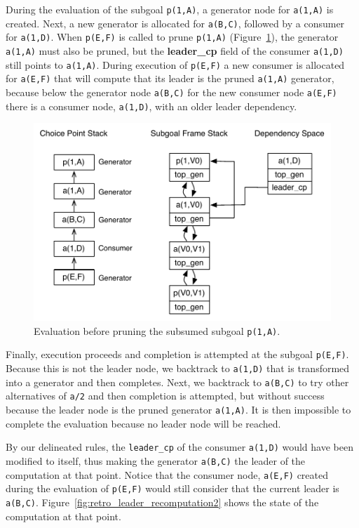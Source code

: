 During the evaluation of the subgoal \texttt{p(1,A)}, a generator node
for \texttt{a(1,A)} is created. Next, a new generator is allocated for \texttt{a(B,C)},
followed by a consumer for \texttt{a(1,D)}. When \texttt{p(E,F)} is called to
prune \texttt{p(1,A)} (Figure~\ref{fig:retro_leader_recomputation}), the generator \texttt{a(1,A)}
must also be pruned, but the \textbf{leader\_cp} field of the consumer \texttt{a(1,D)} still points
to \texttt{a(1,A)}. During execution of \texttt{p(E,F)} a new consumer is allocated for \texttt{a(E,F)} that
will compute that its leader is the pruned \texttt{a(1,A)} generator, because below
the generator node \texttt{a(B,C)} for the new consumer node \texttt{a(E,F)} there is a consumer node,
\texttt{a(1,D)}, with an older leader dependency.

\begin{figure}[ht]
  \centering
    \includegraphics[scale=0.6]{retro_leader_recomputation.pdf}
  \caption{Evaluation before pruning the subsumed subgoal \texttt{p(1,A)}.}
  \label{fig:retro_leader_recomputation}
\end{figure}

Finally, execution proceeds and completion is attempted at the subgoal \texttt{p(E,F)}.
Because this is not the leader node, we backtrack to \texttt{a(1,D)} that is transformed
into a generator and then completes. Next, we backtrack to \texttt{a(B,C)} to try other
alternatives of \texttt{a/2} and then completion is attempted, but without success because
the leader node is the pruned generator \texttt{a(1,A)}. It is then impossible to complete
the evaluation because no leader node will be reached.

By our delineated rules, the \texttt{leader\_cp} of the consumer \texttt{a(1,D)} would have been
modified to itself, thus making the generator \texttt{a(B,C)} the leader of the computation at that point.
Notice that the consumer node, \texttt{a(E,F)} created during the evaluation of \texttt{p(E,F)} would still
consider that the current leader is \texttt{a(B,C)}. Figure~\ref{fig:retro_leader_recomputation2} shows the
state of the computation at that point.

